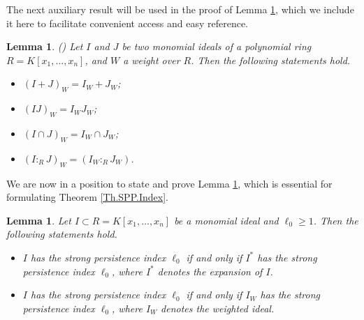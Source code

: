 \documentclass[11pt]{amsart}
\newtheorem{lemma}[theorem]{Lemma}
\begin{document}
\bigskip
The next auxiliary result will be used in the proof of Lemma \ref{Lem.SPP.Index}, which we include it  here to facilitate convenient access and easy reference.


\begin{lemma}\label{LEM. Weighted} (\cite[Lemma 3.5]{SN})
Let $I$ and $J$ be two monomial ideals of a polynomial ring $R=K[x_1, \ldots, x_n]$, and $W$ a weight over $R$. Then the following statements hold. 
\begin {itemize}
\item[(i)] $(I+J)_W= I_W + J_W$;
\item[(ii)] $(IJ)_W= I_W J_W$;
\item[(iii)] $(I\cap J)_W= I_W \cap J_W$;
\item[(iv)] $(I :_RJ)_W= (I_W :_R J_W)$.
\end{itemize}
\end{lemma}


 
 We are now in a position to state and prove Lemma \ref{Lem.SPP.Index},  which is essential for formulating Theorem \ref{Th.SPP.Index}. 
 
 
\begin{lemma}\label{Lem.SPP.Index} 
Let  $I \subset R=K[x_1, \ldots, x_n]$ be a monomial ideal  and $\ell_{0}\geq 1$. Then the following statements hold.
\begin{itemize}
\item[(i)] $I$ has the strong persistence index $\ell_0$  if and only if $I^*$ has the  strong persistence index $\ell_0$, 
  where $I^*$ denotes the  expansion of $I$.  
\item[(ii)] $I$ has the strong persistence index $\ell_0$  if and only if $I_W$ has the  strong persistence index $\ell_0$, 
  where $I_W$ denotes the  weighted ideal.    
\end{itemize}
\end{lemma}
\end{document}
